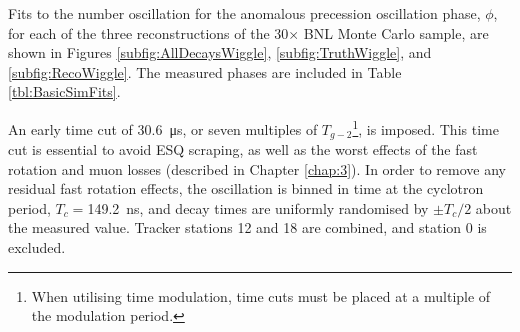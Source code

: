 Fits to the number oscillation for the anomalous precession oscillation phase, $\phi$, for each of the three reconstructions of the 30$\times$ BNL Monte Carlo sample, are shown in Figures \ref{subfig:AllDecaysWiggle}, \ref{subfig:TruthWiggle}, and \ref{subfig:RecoWiggle}. The measured phases are included in Table \ref{tbl:BasicSimFits}.

An early time cut of \SI{30.6}{\micro\second}, or seven multiples of $T_{g-2}$\footnote{When utilising time modulation, time cuts must be placed at a multiple of the modulation period.}, is imposed. This time cut is essential to avoid ESQ scraping, as well as the worst effects of the fast rotation and muon losses (described in Chapter \ref{chap:3}). In order to remove any residual fast rotation effects, the oscillation is binned in time at the cyclotron period, $T_{c} = $\SI{149.2}{\nano\second}, and decay times are uniformly randomised by $\pm T_{c}/2$ about the measured value. Tracker stations 12 and 18 are combined, and station 0 is excluded. 

